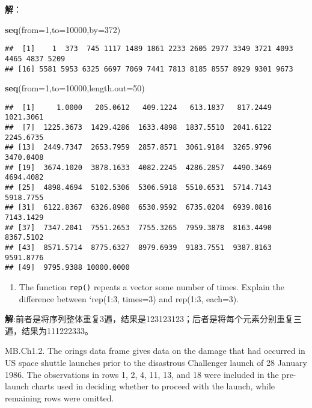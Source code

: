 \documentclass[
]{article}
\newenvironment{Shaded}{\begin{snugshade}}{\end{snugshade}}
\newcommand{\DataTypeTok}[1]{\textcolor[rgb]{0.13,0.29,0.53}{#1}}
\newcommand{\DecValTok}[1]{\textcolor[rgb]{0.00,0.00,0.81}{#1}}
\newcommand{\KeywordTok}[1]{\textcolor[rgb]{0.13,0.29,0.53}{\textbf{#1}}}
\newcommand{\NormalTok}[1]{#1}
\providecommand{\tightlist}{%
  \setlength{\itemsep}{0pt}\setlength{\parskip}{0pt}}
\begin{document}
\textbf{解}：

\begin{Shaded}
\begin{Highlighting}[]
\KeywordTok{seq}\NormalTok{(}\DataTypeTok{from=}\DecValTok{1}\NormalTok{,}\DataTypeTok{to=}\DecValTok{10000}\NormalTok{,}\DataTypeTok{by=}\DecValTok{372}\NormalTok{)}
\end{Highlighting}
\end{Shaded}

\begin{verbatim}
##  [1]    1  373  745 1117 1489 1861 2233 2605 2977 3349 3721 4093 4465 4837 5209
## [16] 5581 5953 6325 6697 7069 7441 7813 8185 8557 8929 9301 9673
\end{verbatim}

\begin{Shaded}
\begin{Highlighting}[]
\KeywordTok{seq}\NormalTok{(}\DataTypeTok{from=}\DecValTok{1}\NormalTok{,}\DataTypeTok{to=}\DecValTok{10000}\NormalTok{,}\DataTypeTok{length.out=}\DecValTok{50}\NormalTok{)}
\end{Highlighting}
\end{Shaded}

\begin{verbatim}
##  [1]     1.0000   205.0612   409.1224   613.1837   817.2449  1021.3061
##  [7]  1225.3673  1429.4286  1633.4898  1837.5510  2041.6122  2245.6735
## [13]  2449.7347  2653.7959  2857.8571  3061.9184  3265.9796  3470.0408
## [19]  3674.1020  3878.1633  4082.2245  4286.2857  4490.3469  4694.4082
## [25]  4898.4694  5102.5306  5306.5918  5510.6531  5714.7143  5918.7755
## [31]  6122.8367  6326.8980  6530.9592  6735.0204  6939.0816  7143.1429
## [37]  7347.2041  7551.2653  7755.3265  7959.3878  8163.4490  8367.5102
## [43]  8571.5714  8775.6327  8979.6939  9183.7551  9387.8163  9591.8776
## [49]  9795.9388 10000.0000
\end{verbatim}

\begin{enumerate}
\def\labelenumi{\alph{enumi}.}
\setcounter{enumi}{1}
\tightlist
\item
  The function \texttt{rep()} repeats a vector some number of times.
  Explain the difference between `rep(1:3, times=3) and rep(1:3,
  each=3).
\end{enumerate}

\textbf{解}:前者是将序列整体重复3遍，结果是123123123；后者是将每个元素分别重复三遍，结果为111222333。

MB.Ch1.2. The orings data frame gives data on the damage that had
occurred in US space shuttle launches prior to the disastrous Challenger
launch of 28 January 1986. The observations in rows 1, 2, 4, 11, 13, and
18 were included in the pre-launch charts used in deciding whether to
proceed with the launch, while remaining rows were omitted.
\end{document}
